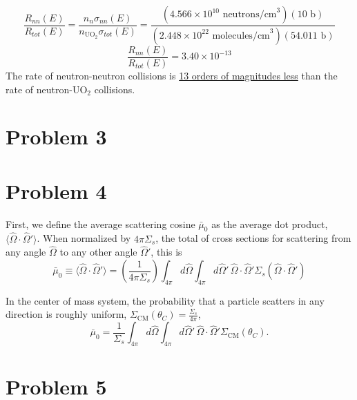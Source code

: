 \documentclass{article}
\newcommand{\Oh}{\hat{\Omega}}
\begin{document}
$$ \frac{R_{nn}(E)}{R_{tot}(E)} = \frac{n_n \sigma_{nn}(E)}{n_{\text{UO}_2} \sigma_{tot}(E)} = \frac{(4.566\times10^{10}\text{ neutrons/cm}^3)(10\text{ b})}{(2.448\times10^{22}\text{ molecules/cm}^3)(54.011\text{ b})}$$
$$ \frac{R_{nn}(E)}{R_{tot}(E)} = 3.40\times10^{-13} $$
The rate of neutron-neutron collisions is \underline{13 orders of magnitudes less} than the rate of neutron-UO$_2$ collisions.



\newpage

\section*{Problem 3}




\section*{Problem 4}

First, we define the average scattering cosine $\bar{\mu}_0$ as the average dot product, $\langle \Oh \cdot \Oh' \rangle$. When normalized by $4\pi\Sigma_s$, the total of cross sections for scattering from any angle $\Oh$ to any other angle $\Oh'$, this is
$$ \bar{\mu}_0 \equiv \langle \Oh \cdot \Oh' \rangle = \left(\frac{1}{4\pi\Sigma_s}\right)  \int_{4\pi} d\Oh \int_{4\pi} d\Oh' \, \Oh \cdot \Oh' \Sigma_s(\Oh \cdot \Oh') $$

In the center of mass system, the probability that a particle scatters in any direction is roughly uniform, $\Sigma_{\text{CM}}(\theta_C) = \frac{\Sigma_s}{4\pi}$,
$$ \bar{\mu}_0 = \frac{1}{\Sigma_s}  \int_{4\pi} d\Oh \int_{4\pi} d\Oh' \, \Oh \cdot \Oh' \Sigma_{\text{CM}}(\theta_C) .$$



\newpage

\section*{Problem 5}
\end{document}
